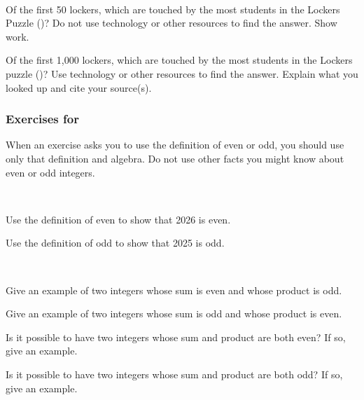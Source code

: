 
\begin{exer}[\exerE] %
\label{exer_lockers_touchedmost}
~
    \begin{apart}
        \item Of the first 50 lockers, which are touched by the most students in the Lockers Puzzle ()?  Do not use technology or other resources to find the answer.  Show work. 
        \item Of the first 1,000 lockers, which are touched by the most students in the Lockers puzzle ()?  Use technology or other resources to find the answer.  Explain what you looked up and cite your source(s). 
    \end{apart}      
\end{exer}


\subsubsection*{Exercises for  \subevenodd}

When an exercise asks you to use the definition of even or odd, you should use only that definition and algebra.  Do not use other facts you might know about even or odd integers.

\begin{exer}[\exerP] %
\label{exer_2026even_2025odd}
~
    \begin{exerpart}
        \item Use the definition of even to show that 2026 is even.
        \item Use the definition of odd to show that 2025 is odd.       
    \end{exerpart}
\end{exer}

\begin{exer}[\exerP] %
\label{exer_examples_even_odd_sum_product}
~
    \begin{exerpart}
        \item Give an example of two integers whose sum is even and whose product is odd.
        \item Give an example of two integers whose sum is odd and whose product is even.
        \item Is it possible to have two integers whose sum and product are both even?  If so, give an example.
        \item Is it possible to have two integers whose sum and product are both odd?  If so, give an example.
    \end{exerpart}
\end{exer}

